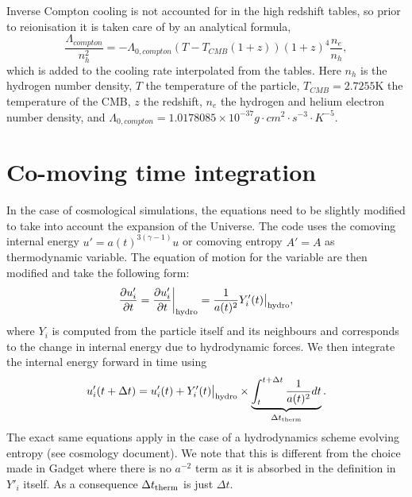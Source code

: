 \documentclass[fleqn, usenatbib, useAMS, a4paper]{mnras}
\begin{document}
Inverse Compton cooling is not accounted for in the high redshift tables, so prior 
to reionisation it is taken care of by an analytical formula,
\begin{equation}
\frac{\Lambda_{compton}}{n_h^2} = -\Lambda_{0,compton} \left( T - T_{CMB}(1+z) 
\right) (1+z)^4 \frac{n_e}{n_h},
\end{equation}
which is added to the cooling rate interpolated from the tables. Here $n_h$ is the
hydrogen number density, $T$ the temperature of the particle, $T_{CMB} = 2.7255$K 
the temperature of the CMB, $z$ the redshift, $n_e$ the hydrogen and helium electron
number density, and $\Lambda_{0,compton} = 1.0178085 \times 10^{-37} g \cdot cm^2 
\cdot s^{-3} \cdot K^{-5}$. 

\section{Co-moving time integration}

In the case of cosmological simulations, the equations need to be
slightly modified to take into account the expansion of the
Universe. The code uses the comoving internal energy $u' =
a(t)^{3(\gamma-1)}u$ or comoving entropy $A'=A$ as thermodynamic
variable. The equation of motion for the variable are then modified
and take the following form:
\begin{equation}
  \frac{\partial u'_i}{\partial t} = \frac{\partial u'_i}{\partial
    t}\bigg|_{\rm hydro}  = \frac{1}{a(t)^2} Y'_i(t)\big|_{\rm
    hydro},
\end{equation}
where $Y_i$ is computed from the particle itself and its neighbours
and corresponds to the change in internal energy due to hydrodynamic
forces. We then integrate the internal energy forward in time using
\begin{equation}
  u'_i(t+\Delta t) = u'_i(t) + Y'_i(t)\big|_{\rm hydro} \times \underbrace{\int_t^{t+\Delta t}
  \frac{1}{a(t)^2} dt}_{\Delta t_{\rm therm}}.
\end{equation}
The exact same equations apply in the case of a hydrodynamics scheme
evolving entropy (see cosmology document). We note that this is
different from the choice made in Gadget where there is no $a^{-2}$
term as it is absorbed in the definition in $Y'_i$ itself. As a
consequence $\Delta t_{\rm therm}$ is just $\Delta t$.
\end{document}
